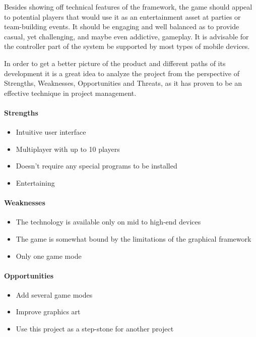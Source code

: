 Besides showing off technical features of the framework, the game should
appeal to potential players that would use it as an entertainment asset at
parties or team-building events. It should be engaging and well balanced as to
provide casual, yet challenging, and maybe even addictive, gameplay. It is
advisable for the controller part of the system be supported by most types of
mobile devices.

In order to get a better picture of the product and different paths of its
development it is a great idea to analyze the project from the perspective of
Strengths, Weaknesses, Opportunities and Threats, as it has proven to be an
effective technique in project management.

\paragraph{Strengths}

\begin{itemize}
    \item Intuitive user interface
    \item Multiplayer with up to 10 players
    \item Doesn't require any special programs to be installed
    \item Entertaining
\end{itemize}

\paragraph{Weaknesses}

\begin{itemize}
    \item The technology is available only on mid to high-end devices
    \item The game is somewhat bound by the limitations of the graphical framework
    \item Only one game mode
\end{itemize}

\paragraph{Opportunities}

\begin{itemize}
    \item Add several game modes
    \item Improve graphics art
    \item Use this project as a step-stone for another project
\end{itemize}

